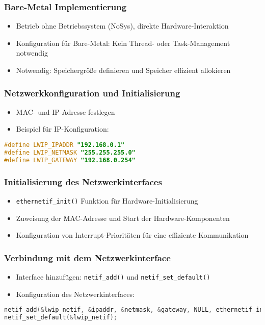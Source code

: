 \documentclass{beamer}
\begin{document}
\begin{frame}
\frametitle{Bare-Metal Implementierung}
\begin{itemize}
    \item Betrieb ohne Betriebssystem (NoSys), direkte Hardware-Interaktion
    \item Konfiguration für Bare-Metal: Kein Thread- oder Task-Management notwendig
    \item Notwendig: Speichergröße definieren und Speicher effizient allokieren
\end{itemize}
\end{frame}

\begin{frame}[fragile]
\frametitle{Netzwerkkonfiguration und Initialisierung}
\begin{itemize}
    \item MAC- und IP-Adresse festlegen
    \item Beispiel für IP-Konfiguration:
\end{itemize}
\begin{lstlisting}[language=C]
#define LWIP_IPADDR "192.168.0.1"
#define LWIP_NETMASK "255.255.255.0"
#define LWIP_GATEWAY "192.168.0.254"
\end{lstlisting}
\end{frame}

\begin{frame}
\frametitle{Initialisierung des Netzwerkinterfaces}
\begin{itemize}
    \item \texttt{ethernetif\_init()} Funktion für Hardware-Initialisierung
    \item Zuweisung der MAC-Adresse und Start der Hardware-Komponenten
    \item Konfiguration von Interrupt-Prioritäten für eine effiziente Kommunikation
\end{itemize}
\end{frame}

\begin{frame}[fragile]
\frametitle{Verbindung mit dem Netzwerkinterface}
\begin{itemize}
    \item Interface hinzufügen: \texttt{netif\_add()} und \texttt{netif\_set\_default()}
    \item Konfiguration des Netzwerkinterfaces:
\end{itemize}
\begin{lstlisting}[language=C]
netif_add(&lwip_netif, &ipaddr, &netmask, &gateway, NULL, ethernetif_init, netif_input);
netif_set_default(&lwip_netif);
\end{lstlisting}
\end{frame}
\end{document}
